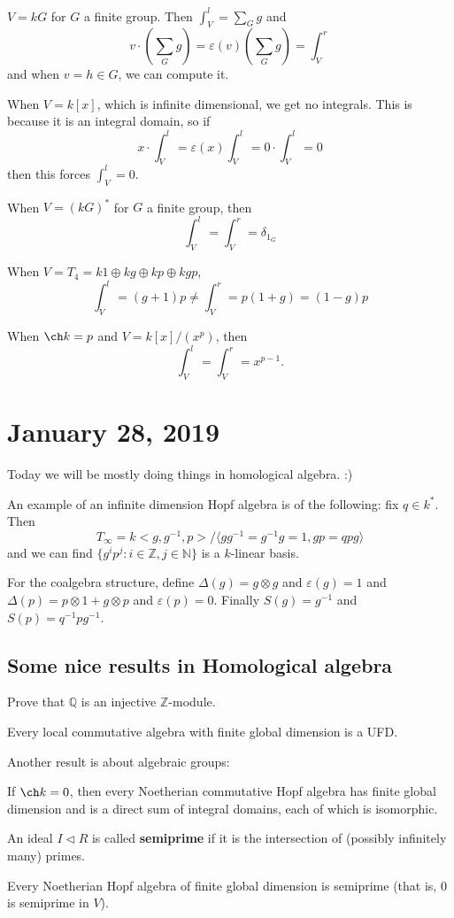 \documentclass[12pt]{article}
\newcommand*{\Z}{
\mathbb{Z}
}
\newcommand*{\N}{
\mathbb{N}
}
\newcommand*{\Q}{
\mathbb{Q}
}
\begin{document}
\begin{ex}
	$V=kG$ for $G$ a finite group. Then $\int_V^l=\sum_G g$ and
	\[v\cdot(\sum_G g)=\varepsilon(v)(\sum_G g)=\int_V^r\]
	and when $v=h\in G$, we can compute it.
\end{ex}
\begin{ex}
	When $V=k[x]$, which is infinite dimensional, we get no integrals. This is because it is an 
	integral domain, so if
	\[x\cdot\int_V^l=\varepsilon(x)\int_V^l=0\cdot\int_V^l=0\]
	then this forces $\int_V^l=0$.
\end{ex}
\begin{ex}
	When $V=(kG)^*$ for $G$ a finite group, then 
	\[\int_V^l=\int_V^r=\delta_{1_G}\]
\end{ex}
\begin{ex}
	When $V=T_4=k1\oplus kg\oplus kp\oplus kgp$,
	\[\int_V^l=(g+1)p\ne\int_V^r=p(1+g)=(1-g)p\]
\end{ex}
\begin{ex}
	When $\ch k=p$ and $V=k[x]/(x^p)$, then 
	\[\int_V^l=\int_V^r=x^{p-1}.\]
\end{ex}

\section{January 28, 2019}
Today we will be mostly doing things in homological algebra. :)
\begin{ex}
	An example of an infinite dimension Hopf algebra is of the following: fix $q\in k^*$. Then 
	\[T_\infty=k<g, g^{-1}, p>/\langle gg^{-1}=g^{-1}g=1, gp=qpg\rangle\]
	and we can find $\{g^ip^j:i\in\Z, j\in\N\}$ is a $k$-linear basis.

	For the coalgebra structure, define $\Delta(g)=g\otimes g$ and $\varepsilon(g)=1$ and 
	$\Delta(p)=p\otimes 1+g\otimes p$ and $\varepsilon(p)=0$. Finally $S(g)=g^{-1}$ and $S(p)=q^{-1}pg^{-1}$.
\end{ex}

\subsection{Some nice results in Homological algebra}
\begin{prob}
	Prove that $\Q$ is an injective $\Z$-module.
\end{prob}
\begin{thm}
	Every local commutative algebra with finite global dimension is a UFD.
\end{thm}
Another result is about algebraic groups:
\begin{thm}
	If $\ch k=0$, then every Noetherian commutative Hopf algebra has finite global dimension
	and is a direct sum of integral domains, each of which is isomorphic.
\end{thm}
\begin{defn}[Semiprime]
	An ideal $I\lhd R$ is called \textbf{semiprime} if it is the intersection of (possibly infinitely many) primes.
\end{defn}
\begin{conj}
	Every Noetherian Hopf algebra of finite global dimension is semiprime (that is, 0 is semiprime in $V$).
\end{conj}
\end{document}
